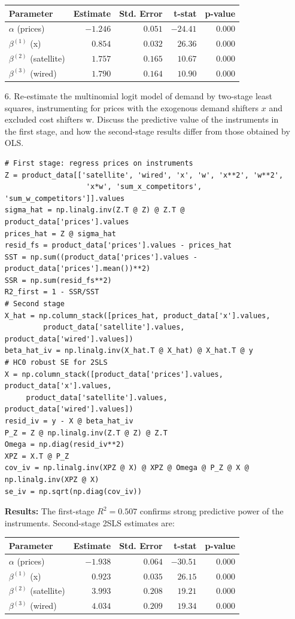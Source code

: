 \documentclass[english,11pt]{article}
\begin{document}
\begin{enumerate}
\begin{center}
\begin{tabular}{lrrrr}
\hline
Parameter & Estimate & Std. Error & t-stat & p-value \\
\hline
$\alpha$ (prices) & $-1.246$ & $0.051$ & $-24.41$ & $0.000$ \\
$\beta^{(1)}$ (x) & $0.854$ & $0.032$ & $26.36$ & $0.000$ \\
$\beta^{(2)}$ (satellite) & $1.757$ & $0.165$ & $10.67$ & $0.000$ \\
$\beta^{(3)}$ (wired) & $1.790$ & $0.164$ & $10.90$ & $0.000$ \\
\hline
\end{tabular}
\end{center}
\item[6.] Re-estimate the multinomial logit model of demand by two-stage
least squares, instrumenting for prices with the exogenous demand shifters $%
x $ and excluded cost shifters w. Discuss the predictive value of the instruments in the first stage, and how the second-stage results differ from those
obtained by OLS. \begin{verbatim}
# First stage: regress prices on instruments
Z = product_data[['satellite', 'wired', 'x', 'w', 'x**2', 'w**2', 
                   'x*w', 'sum_x_competitors', 'sum_w_competitors']].values
sigma_hat = np.linalg.inv(Z.T @ Z) @ Z.T @ product_data['prices'].values
prices_hat = Z @ sigma_hat
resid_fs = product_data['prices'].values - prices_hat
SST = np.sum((product_data['prices'].values - product_data['prices'].mean())**2)
SSR = np.sum(resid_fs**2)
R2_first = 1 - SSR/SST
# Second stage
X_hat = np.column_stack([prices_hat, product_data['x'].values,
         product_data['satellite'].values, product_data['wired'].values])
beta_hat_iv = np.linalg.inv(X_hat.T @ X_hat) @ X_hat.T @ y
# HC0 robust SE for 2SLS
X = np.column_stack([product_data['prices'].values, product_data['x'].values,
     product_data['satellite'].values, product_data['wired'].values])
resid_iv = y - X @ beta_hat_iv
P_Z = Z @ np.linalg.inv(Z.T @ Z) @ Z.T
Omega = np.diag(resid_iv**2)
XPZ = X.T @ P_Z
cov_iv = np.linalg.inv(XPZ @ X) @ XPZ @ Omega @ P_Z @ X @ np.linalg.inv(XPZ @ X)
se_iv = np.sqrt(np.diag(cov_iv))
\end{verbatim}


\textbf{Results:} The first-stage $R^2 = 0.507$ confirms strong predictive power of the instruments. Second-stage 2SLS estimates are:

\begin{center}
\begin{tabular}{lrrrr}
\hline
Parameter & Estimate & Std. Error & t-stat & p-value \\
\hline
$\alpha$ (prices) & $-1.938$ & $0.064$ & $-30.51$ & $0.000$ \\
$\beta^{(1)}$ (x) & $0.923$ & $0.035$ & $26.15$ & $0.000$ \\
$\beta^{(2)}$ (satellite) & $3.993$ & $0.208$ & $19.21$ & $0.000$ \\
$\beta^{(3)}$ (wired) & $4.034$ & $0.209$ & $19.34$ & $0.000$ \\
\hline
\end{tabular}
\end{center}


\end{enumerate}
\end{document}
